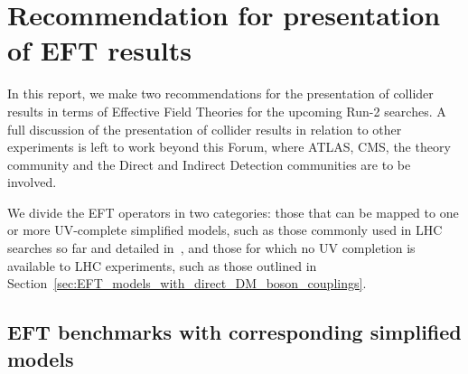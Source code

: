 \section{Recommendation for presentation of EFT results} %
\label{sec:RecommendationEFTResults}

In this report,
we make two recommendations for the presentation of collider results
in terms of Effective Field Theories for the upcoming Run-2 searches. 
A full discussion of the presentation of
collider results in relation to other experiments
is left to work beyond this Forum, where ATLAS, CMS, the theory community
and the Direct and Indirect Detection communities are to be involved. 

We divide the EFT operators in two categories: 
those that can be mapped to one or more UV-complete simplified models, such as those
commonly used in LHC searches so far and detailed in~\cite{Goodman:2010ku}, and those
for which no UV completion is available to LHC experiments, such as those outlined in Section~\ref{sec:EFT_models_with_direct_DM_boson_couplings}.

\subsection{EFT benchmarks with corresponding simplified models}
\label{sub:EFT_withSimp}

